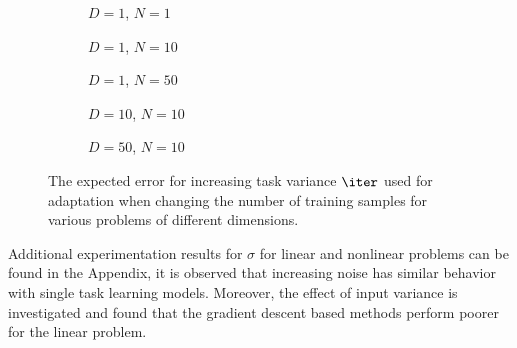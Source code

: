\begin{figure}[!h]
  \centering
    \begin{subfigure}{0.33\textwidth}
      \centering
      \caption{$D=1$, $N=1$}
      \label{fig:nonlinear-c2-N-1-D-1}
    \end{subfigure}
    \begin{subfigure}{0.33\textwidth}
      \centering
      \caption{$D=1$, $N=10$}
      \label{fig:nonlinear-c2-N-10-D-1}
    \end{subfigure}
    \begin{subfigure}{0.33\textwidth}
      \centering
      \caption{$D=1$, $N=50$}
      \label{fig:nonlinear-c2-N-50-D-1}
    \end{subfigure}

    \begin{subfigure}{0.33\textwidth}
      \centering
      \caption{$D=10$, $N=10$}
      \label{fig:nonlinear-c2-N-10-D-10}
    \end{subfigure}
    \begin{subfigure}{0.33\textwidth}
      \centering
      \caption{$D=50$, $N=10$}
      \label{fig:nonlinear-c2-N-10-D-50}
    \end{subfigure}  


  \caption{The expected error for increasing task variance $\iter$ used for adaptation when changing the number of training samples for various problems of different dimensions.}
  \label{fig:nonlinear-c2}
\end{figure}

Additional experimentation results for $\sigma$ for linear and nonlinear problems can be found in the Appendix, it is observed that increasing noise has similar behavior with single task learning models. Moreover, the effect of input variance is investigated and found that the gradient descent based methods perform poorer for the linear problem. 


